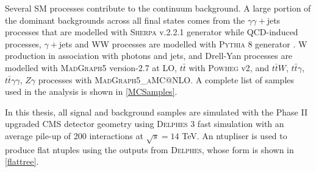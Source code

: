 {Several SM processes contribute to the continuum background. A large portion of the dominant backgrounds across all final states comes from the $\gamma\gamma+$jets processes that are modelled with \textsc{Sherpa} v.2.2.1 generator \cite{10.21468/SciPostPhys.7.3.034} while QCD-induced processes, $\gamma+$jets and WW processes are modelled with \textsc{Pythia} 8 generator \cite{Sjstrand2015}. W production in association with photons and jets, and Drell-Yan processes are modelled with \textsc{MadGraph5} version-2.7 at LO, $t\bar t$ with \textsc{Powheg} v2, and $t\bar tW$, $t\bar t\gamma$, $t\bar t\gamma\gamma$, $Z\gamma$ processes with \textsc{MadGraph5\_aMC@NLO}. A complete list of samples used in the analysis is shown in \autoref{MCSamples}.

In this thesis, all signal and background samples are simulated with the Phase II upgraded CMS detector geometry using \textsc{Delphes} 3 fast simulation \cite{Selvaggi:2014mya} with an average pile-up of 200 interactions at $\sqrt{s}=14$ TeV. An ntupliser is used to produce flat ntuples using the outputs from \textsc{Delphes}, whose form is shown in \autoref{flattree}.

}
